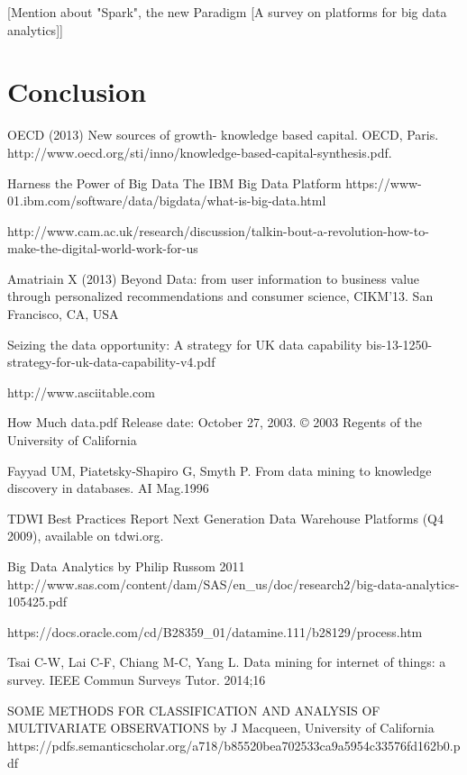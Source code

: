 \documentclass[10pt,journal,compsoc]{IEEEtran}
\begin{document}
[Mention about "Spark", the new Paradigm [A survey on platforms for big data analytics]]


\section{Conclusion}

\begin{thebibliography}{1}

OECD (2013) New sources of growth- knowledge based capital. OECD, Paris. 
http://www.oecd.org/sti/inno/knowledge-based-capital-synthesis.pdf.

Harness the Power of Big Data The IBM Big Data Platform
https://www-01.ibm.com/software/data/bigdata/what-is-big-data.html

http://www.cam.ac.uk/research/discussion/talkin-bout-a-revolution-how-to-make-the-digital-world-work-for-us

Amatriain X (2013) Beyond Data: from user information to business value through personalized recommendations
and consumer science, CIKM’13. San Francisco, CA, USA

Seizing the data opportunity: A strategy for UK data capability
bis-13-1250-strategy-for-uk-data-capability-v4.pdf

http://www.asciitable.com

How Much data.pdf
Release date: October 27, 2003. © 2003 Regents of the University of California

Fayyad UM, Piatetsky-Shapiro G, Smyth P. From data mining to knowledge discovery in databases. AI Mag.1996

TDWI Best Practices Report Next Generation Data Warehouse Platforms (Q4 2009), available on tdwi.org.

Big Data Analytics by Philip Russom 2011
http://www.sas.com/content/dam/SAS/en\_us/doc/research2/big-data-analytics-105425.pdf

https://docs.oracle.com/cd/B28359\_01/datamine.111/b28129/process.htm

Tsai C-W, Lai C-F, Chiang M-C, Yang L. Data mining for internet of things: a survey. IEEE Commun Surveys Tutor.
2014;16

SOME METHODS FOR CLASSIFICATION AND ANALYSIS OF MULTIVARIATE OBSERVATIONS by J Macqueen, University of California
https://pdfs.semanticscholar.org/a718/b85520bea702533ca9a5954c33576fd162b0.pdf


\end{thebibliography}
\end{document}
